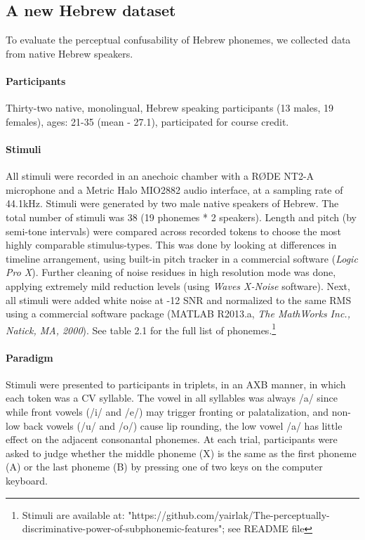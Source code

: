 \subsection{A new Hebrew dataset}
To evaluate the perceptual confusability of Hebrew phonemes, we collected data from native Hebrew speakers.

\paragraph{Participants}
Thirty-two native, monolingual, Hebrew speaking participants (13 males, 19 females), ages: 21-35 (mean - 27.1), participated for course credit.

\paragraph{Stimuli}
All stimuli were recorded in an anechoic chamber with a RØDE NT2-A microphone and a Metric Halo MIO2882 audio interface, at a sampling rate of 44.1kHz. Stimuli were generated by two male native speakers of Hebrew. The total number of stimuli was 38 (19 phonemes * 2 speakers). Length and pitch (by semi-tone intervals) were compared across recorded tokens to choose the most highly comparable stimulus-types. This was done by looking at differences in timeline arrangement, using built-in pitch tracker in a commercial software (\textit{Logic Pro X}). Further cleaning of noise residues in high resolution mode was done, applying extremely mild reduction levels (using \textit{Waves X-Noise} software). Next, all stimuli were added white noise at -12 SNR and normalized to the same RMS using a commercial software package (MATLAB R2013.a, \textit{The MathWorks Inc., Natick, MA, 2000}). See table 2.1 for the full list of phonemes.\footnote{Stimuli are available at: "https://github.com/yairlak/The-perceptually-discriminative-power-of-subphonemic-features"; see README file}

\paragraph{Paradigm}
Stimuli were presented to participants in triplets, in an AXB manner, in which each token was a CV syllable. The vowel in all syllables was always /a/ since while front vowels (/i/ and /e/) may trigger fronting or palatalization, and non-low back vowels (/u/ and /o/) cause lip rounding, the low vowel /a/ has little effect on the adjacent consonantal phonemes. At each trial, participants were asked to judge whether the middle phoneme (X) is the same as the first phoneme (A) or the last phoneme (B) by pressing one of two keys on the computer keyboard.

